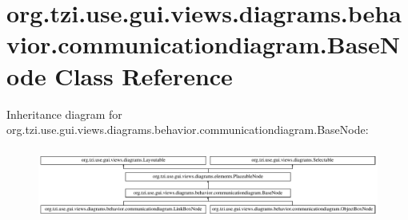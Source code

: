\hypertarget{classorg_1_1tzi_1_1use_1_1gui_1_1views_1_1diagrams_1_1behavior_1_1communicationdiagram_1_1_base_node}{\section{org.\-tzi.\-use.\-gui.\-views.\-diagrams.\-behavior.\-communicationdiagram.\-Base\-Node Class Reference}
\label{classorg_1_1tzi_1_1use_1_1gui_1_1views_1_1diagrams_1_1behavior_1_1communicationdiagram_1_1_base_node}
}
Inheritance diagram for org.\-tzi.\-use.\-gui.\-views.\-diagrams.\-behavior.\-communicationdiagram.\-Base\-Node\-:\begin{figure}[H]
\begin{center}
\leavevmode
\includegraphics[height=2.388060cm]{classorg_1_1tzi_1_1use_1_1gui_1_1views_1_1diagrams_1_1behavior_1_1communicationdiagram_1_1_base_node}
\end{center}
\end{figure}
